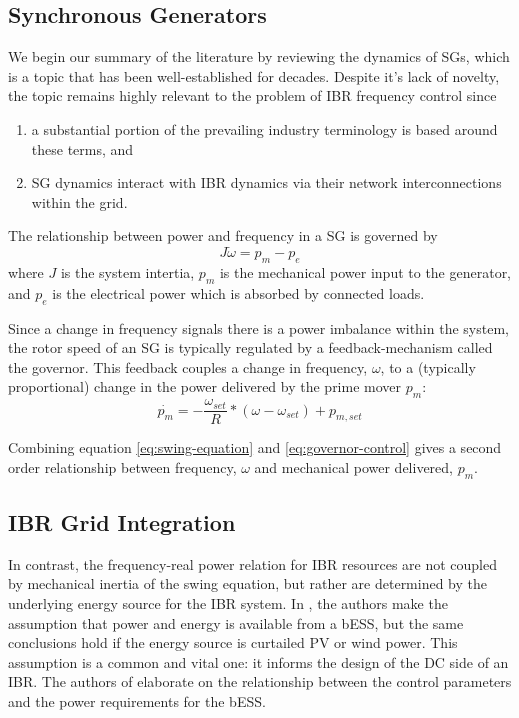 

\label{sec:math-models}

\subsection{Synchronous Generators}
 We begin our summary of the literature by reviewing the dynamics of SGs, 
 which is a topic that has been well-established
 for decades. Despite it's lack of novelty, the topic remains highly
 relevant to the problem of IBR frequency control since
 \begin{enumerate}
  \item a substantial portion of the prevailing industry terminology
    is based around these terms, and
  \item SG dynamics interact with IBR dynamics via their network
    interconnections within the grid.
 \end{enumerate}


 The relationship between power and frequency in a SG is governed by
 \begin{equation}
  J\dot{\omega} = p_m - p_e
  \label{eq:swing-equation}
 \end{equation}
 where $J$ is the system intertia, $p_m$ is the mechanical power input to
 the generator, and $p_e$ is the electrical power which is absorbed
 by connected loads.

Since a change in frequency signals there is a power imbalance within the
system, the rotor speed of an SG is typically regulated by a
feedback-mechanism called the governor. This feedback couples a change in 
frequency, $\omega$, to a (typically proportional) change in the power
delivered by the prime mover $p_m$:
\begin{equation}
  \dot{p_m} = - \frac{\omega_{set}}{R} * (\omega - \omega_{set}) + p_{m,set}
  \label{eq:governor-control}
\end{equation}

Combining equation \ref{eq:swing-equation} and \ref{eq:governor-control}
gives a second order relationship between frequency, $\omega$ and 
mechanical power delivered, $p_m$.
 
\subsection{IBR Grid Integration} \label{sec:grid-integration}
In contrast, the frequency-real power relation for IBR resources are not
coupled by mechanical inertia of the swing equation,
but rather are determined by the underlying energy source for the IBR system.
In \cite{kenyon_interactive_2023}, the authors
make the assumption that power and energy is available from a bESS,
but the same conclusions hold if the energy source is curtailed PV or wind power.
This assumption is a common and vital one: it informs the design of
the DC side of an IBR. The authors of \cite{allehyani_effect_2022}
elaborate on the relationship between the control parameters and
the power requirements for the bESS.


